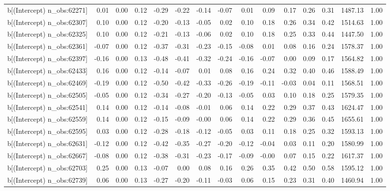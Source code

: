 \begin{table}[ht]
\begin{tabular}{rrrrrrrrrrrrrrr}
  b[(Intercept) n\_obs:62271] & 0.01 & 0.00 & 0.12 & -0.29 & -0.22 & -0.14 & -0.07 & 0.01 & 0.09 & 0.17 & 0.26 & 0.31 & 1487.13 & 1.00 \\ 
  b[(Intercept) n\_obs:62307] & 0.10 & 0.00 & 0.12 & -0.20 & -0.13 & -0.05 & 0.02 & 0.10 & 0.18 & 0.26 & 0.34 & 0.42 & 1514.63 & 1.00 \\ 
  b[(Intercept) n\_obs:62325] & 0.10 & 0.00 & 0.12 & -0.21 & -0.13 & -0.06 & 0.02 & 0.10 & 0.18 & 0.25 & 0.33 & 0.44 & 1447.50 & 1.00 \\ 
  b[(Intercept) n\_obs:62361] & -0.07 & 0.00 & 0.12 & -0.37 & -0.31 & -0.23 & -0.15 & -0.08 & 0.01 & 0.08 & 0.16 & 0.24 & 1578.37 & 1.00 \\ 
  b[(Intercept) n\_obs:62397] & -0.16 & 0.00 & 0.13 & -0.48 & -0.41 & -0.32 & -0.24 & -0.16 & -0.07 & 0.00 & 0.09 & 0.17 & 1564.82 & 1.00 \\ 
  b[(Intercept) n\_obs:62433] & 0.16 & 0.00 & 0.12 & -0.14 & -0.07 & 0.01 & 0.08 & 0.16 & 0.24 & 0.32 & 0.40 & 0.46 & 1588.49 & 1.00 \\ 
  b[(Intercept) n\_obs:62469] & -0.19 & 0.00 & 0.12 & -0.50 & -0.42 & -0.33 & -0.26 & -0.19 & -0.11 & -0.03 & 0.04 & 0.11 & 1568.51 & 1.00 \\ 
  b[(Intercept) n\_obs:62505] & -0.05 & 0.00 & 0.12 & -0.34 & -0.27 & -0.20 & -0.13 & -0.05 & 0.03 & 0.10 & 0.18 & 0.25 & 1579.35 & 1.00 \\ 
  b[(Intercept) n\_obs:62541] & 0.14 & 0.00 & 0.12 & -0.14 & -0.08 & -0.01 & 0.06 & 0.14 & 0.22 & 0.29 & 0.37 & 0.43 & 1624.47 & 1.00 \\ 
  b[(Intercept) n\_obs:62559] & 0.14 & 0.00 & 0.12 & -0.15 & -0.09 & -0.00 & 0.06 & 0.14 & 0.22 & 0.29 & 0.36 & 0.45 & 1655.61 & 1.00 \\ 
  b[(Intercept) n\_obs:62595] & 0.03 & 0.00 & 0.12 & -0.28 & -0.18 & -0.12 & -0.05 & 0.03 & 0.11 & 0.18 & 0.25 & 0.32 & 1593.13 & 1.00 \\ 
  b[(Intercept) n\_obs:62631] & -0.12 & 0.00 & 0.12 & -0.42 & -0.35 & -0.27 & -0.20 & -0.12 & -0.04 & 0.03 & 0.11 & 0.20 & 1580.99 & 1.00 \\ 
  b[(Intercept) n\_obs:62667] & -0.08 & 0.00 & 0.12 & -0.38 & -0.31 & -0.23 & -0.17 & -0.09 & -0.00 & 0.07 & 0.15 & 0.22 & 1617.37 & 1.00 \\ 
  b[(Intercept) n\_obs:62703] & 0.25 & 0.00 & 0.13 & -0.07 & 0.00 & 0.08 & 0.16 & 0.26 & 0.35 & 0.42 & 0.50 & 0.58 & 1595.12 & 1.00 \\ 
  b[(Intercept) n\_obs:62739] & 0.06 & 0.00 & 0.13 & -0.27 & -0.20 & -0.11 & -0.03 & 0.06 & 0.15 & 0.23 & 0.31 & 0.40 & 1460.94 & 1.00 \\ 

\end{tabular}
\end{table}
